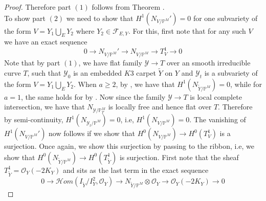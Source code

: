 \documentclass[11pt,twoside]{amsart}
\theoremstyle{plain}
\numberwithin{equation}{section}
\theoremstyle{definition}
\begin{document}
\begin{proof}

Therefore part $(1)$ follows from Theorem \cite[Theorem $2.10$]{BGM24}. \\
To show part $(2)$ we need to show that $H^1(N_{V/\mathbb{P}^M}') = 0$ for one subvariety of the form $V = Y_1 \bigcup_E Y_2$ where $Y_2 \in \mathcal{F}_{E,Y}$. For this, first note that for any such $V$ we have an exact sequence 
$$0 \to N_{V/\mathbb{P}^M}' \to N_{V/\mathbb{P}^M} \to T_V^1 \to 0$$
Note that by part $(1)$, we have flat family $\mathcal{Y} \to T$ over an smooth irreducible curve $T$, such that $\mathcal{Y}_0$ is an embedded $K3$ carpet $\widetilde{Y}$ on $Y$ and $\mathcal{Y}_t$ is a subvariety of the form $V = Y_1 \bigcup_E Y_2$. When $a \geq 2$, by \cite[Theorem $5.1$, equation $(5.9)$]{BMR21}, we have that $H^1(N_{\widetilde{Y}/\mathbb{P}^M}) = 0$, while for $a = 1$, the same holds for by \cite[Theorem $4.1$]{GP97}. Now since the family $\mathcal{Y} \to T$ is local complete intersection, we have that $N_{\mathcal{Y}/\mathbb{P}_T^M}$ is locally free and hence flat over $T$. Therefore by semi-continuity, $H^1(N_{\mathcal{Y}_t/\mathbb{P}^M}) = 0$, i.e, $H^1(N_{V/\mathbb{P}^M}) = 0$. The vanishing of $H^1(N_{V/\mathbb{P}^M}')$ now follows if we show that $H^0(N_{V/\mathbb{P}^M}) \to H^0(T_V^1)$ is a surjection. Once again, we show this surjection by passing to the ribbon, i.e, we show that $H^0(N_{\widetilde{Y}/\mathbb{P}^M}) \to H^0(T_{\widetilde{Y}}^1)$ is surjection. First note that the sheaf $T_{\widetilde{Y}}^1 = \mathcal{O}_Y(-2K_Y)$ and sits as the last term in the exact sequence 
\begin{equation*}
    0 \to \mathcal{H}om(I_{\widetilde{Y}}/I_{Y}^2, \mathcal{O}_Y) \to N_{\widetilde{Y}/\mathbb{P}^M} \otimes \mathcal{O}_Y \to \mathcal{O}_Y(-2K_Y) \to 0
\end{equation*}


\end{proof}
\end{document}
